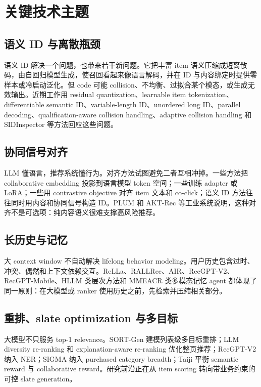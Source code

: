 \documentclass[UTF8,fontset=fandol,11pt]{ctexart}
\begin{document}
\section{关键技术主题}

\subsection{语义 ID 与离散瓶颈}

语义 ID 解决一个问题，也带来若干新问题。它把丰富 item 语义压缩成短离散码，由自回归模型生成，使召回看起来像语言解码，并在 ID 与内容绑定时提供零样本或冷启动泛化。但 code 可能 collision、不均衡、过拟合某个模态，或生成无效输出。近期工作用 residual quantization、learnable item tokenization、differentiable semantic ID、variable-length ID、unordered long ID、parallel decoding、qualification-aware collision handling、adaptive collision handling 和 SIDInspector 等方法回应这些问题。

\subsection{协同信号对齐}

LLM 懂语言，推荐系统懂行为。对齐方法试图避免二者互相冲掉。一些方法把 collaborative embedding 投影到语言模型 token 空间；一些训练 adapter 或 LoRA；一些用 contrastive objective 对齐 item 文本和 co-click；语义 ID 方法往往同时用内容和协同信号构造 ID。PLUM 和 AKT-Rec 等工业系统说明，这种对齐不是可选项：纯内容语义很难支撑高风险推荐。

\subsection{长历史与记忆}

大 context window 不自动解决 lifelong behavior modeling。用户历史包含过时、冲突、偶然和上下文依赖交互。ReLLa、RALLRec、AIR、RecGPT-V2、RecGPT-Mobile、HLLM 类层次方法和 MMEACR 类多模态记忆 agent 都体现了同一原则：在大模型或 ranker 使用历史之前，先检索并压缩相关部分。

\subsection{重排、slate optimization 与多目标}

大模型不只服务 top-1 relevance。SORT-Gen 建模列表级多目标重排；LLM diversity re-ranking 和 explanation-aware re-ranking 优化整页推荐；RecGPT-V2 纳入 NER；SIGMA 纳入 purchased category breadth；Taiji 平衡 semantic reward 与 collaborative reward。研究前沿正在从 item scoring 转向带业务约束的可控 slate generation。
\end{document}
